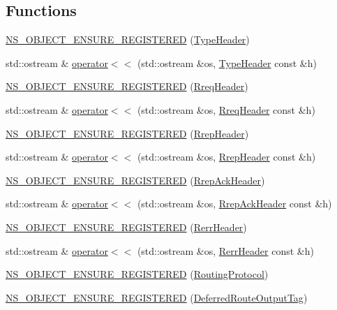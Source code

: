 \subsection*{Functions}
\begin{DoxyCompactItemize}
\item 
\hyperlink{namespacens3_1_1aodv_a676bd2634b5fae8a1d4b75fec94461eb}{N\+S\+\_\+\+O\+B\+J\+E\+C\+T\+\_\+\+E\+N\+S\+U\+R\+E\+\_\+\+R\+E\+G\+I\+S\+T\+E\+R\+ED} (\hyperlink{classns3_1_1aodv_1_1TypeHeader}{Type\+Header})
\item 
std\+::ostream \& \hyperlink{namespacens3_1_1aodv_a90ef9ec7b33676a188a27d37e74b8d44}{operator$<$$<$} (std\+::ostream \&os, \hyperlink{classns3_1_1aodv_1_1TypeHeader}{Type\+Header} const \&h)
\item 
\hyperlink{namespacens3_1_1aodv_a7211789211837615faa1f2124955024d}{N\+S\+\_\+\+O\+B\+J\+E\+C\+T\+\_\+\+E\+N\+S\+U\+R\+E\+\_\+\+R\+E\+G\+I\+S\+T\+E\+R\+ED} (\hyperlink{classns3_1_1aodv_1_1RreqHeader}{Rreq\+Header})
\item 
std\+::ostream \& \hyperlink{namespacens3_1_1aodv_a3d3e78cc63ed6b8026c97501e54b2cf4}{operator$<$$<$} (std\+::ostream \&os, \hyperlink{classns3_1_1aodv_1_1RreqHeader}{Rreq\+Header} const \&h)
\item 
\hyperlink{namespacens3_1_1aodv_a10a2de3f3142c601399791086da01970}{N\+S\+\_\+\+O\+B\+J\+E\+C\+T\+\_\+\+E\+N\+S\+U\+R\+E\+\_\+\+R\+E\+G\+I\+S\+T\+E\+R\+ED} (\hyperlink{classns3_1_1aodv_1_1RrepHeader}{Rrep\+Header})
\item 
std\+::ostream \& \hyperlink{namespacens3_1_1aodv_a7d52512b5bc6196c6eabcb26ca9102e2}{operator$<$$<$} (std\+::ostream \&os, \hyperlink{classns3_1_1aodv_1_1RrepHeader}{Rrep\+Header} const \&h)
\item 
\hyperlink{namespacens3_1_1aodv_aff9d8a361c73b8bd31c3eb37b05d5bac}{N\+S\+\_\+\+O\+B\+J\+E\+C\+T\+\_\+\+E\+N\+S\+U\+R\+E\+\_\+\+R\+E\+G\+I\+S\+T\+E\+R\+ED} (\hyperlink{classns3_1_1aodv_1_1RrepAckHeader}{Rrep\+Ack\+Header})
\item 
std\+::ostream \& \hyperlink{namespacens3_1_1aodv_a26d242a58b2d7ebe77bfff59c5ce75b1}{operator$<$$<$} (std\+::ostream \&os, \hyperlink{classns3_1_1aodv_1_1RrepAckHeader}{Rrep\+Ack\+Header} const \&h)
\item 
\hyperlink{namespacens3_1_1aodv_aecf6dc931dffd60698905e8487136a9f}{N\+S\+\_\+\+O\+B\+J\+E\+C\+T\+\_\+\+E\+N\+S\+U\+R\+E\+\_\+\+R\+E\+G\+I\+S\+T\+E\+R\+ED} (\hyperlink{classns3_1_1aodv_1_1RerrHeader}{Rerr\+Header})
\item 
std\+::ostream \& \hyperlink{namespacens3_1_1aodv_a1954bbce17a97f6c7f499343302714d8}{operator$<$$<$} (std\+::ostream \&os, \hyperlink{classns3_1_1aodv_1_1RerrHeader}{Rerr\+Header} const \&h)
\item 
\hyperlink{namespacens3_1_1aodv_a4c69a0104d7cf11db0181a8bec658e8e}{N\+S\+\_\+\+O\+B\+J\+E\+C\+T\+\_\+\+E\+N\+S\+U\+R\+E\+\_\+\+R\+E\+G\+I\+S\+T\+E\+R\+ED} (\hyperlink{classns3_1_1aodv_1_1RoutingProtocol}{Routing\+Protocol})
\item 
\hyperlink{namespacens3_1_1aodv_a53cf7f5ba94c22936a05668f36120e53}{N\+S\+\_\+\+O\+B\+J\+E\+C\+T\+\_\+\+E\+N\+S\+U\+R\+E\+\_\+\+R\+E\+G\+I\+S\+T\+E\+R\+ED} (\hyperlink{classns3_1_1aodv_1_1DeferredRouteOutputTag}{Deferred\+Route\+Output\+Tag})
\end{DoxyCompactItemize}

